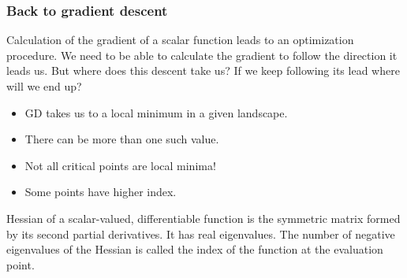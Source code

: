 \documentclass{beamer}
\begin{document}

\begin{frame}
\frametitle{Back to gradient descent}
\begin{block}{}
Calculation of the gradient of a scalar function leads to an optimization procedure. We need to be able to calculate the gradient to follow the direction it leads us. But where does this descent take us? If we keep following its lead where will we end up?
\end{block}
\begin{itemize}
    \item GD takes us to a local minimum in a given landscape.
    \item There can be more than one such value.
    \item Not all critical points are local minima!
    \item Some points have higher index.
\end{itemize}

Hessian of a scalar-valued, differentiable function is the symmetric matrix formed by its second partial derivatives. It has real eigenvalues. The number of negative eigenvalues of the Hessian is called the index of the function at the evaluation point. 

\end{frame}

\end{document}
